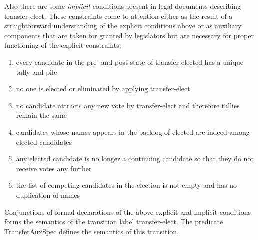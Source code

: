 \documentclass[10pt,conference]{IEEEtran}
\begin{document}
Also there are some \emph{implicit} conditions present in legal documents describing transfer-elect. These constraints come to attention either as the result of a straightforward understanding of the explicit conditions above or as   auxiliary components that are taken for granted by legislators but are
necessary for proper functioning of the explicit constraints;
\begin{enumerate}
\item every candidate in the pre- and post-state of transfer-elected has a unique tally and pile
\item no one is elected or eliminated by applying transfer-elect
\item no candidate attracts any new vote by transfer-elect and therefore tallies remain the same
\item candidates whose names appears in the backlog of elected are indeed among elected candidates
\item any elected candidate is no longer a continuing candidate so that they do not receive votes any further
\item the list of competing candidates in the election is not empty and has no duplication of names
\end{enumerate}  
Conjunctions of formal declarations of the above explicit and implicit conditions forms the semantics of the transition label transfer-elect.   The predicate TransferAuxSpec defines  the semantics of this transition.
\end{document}
